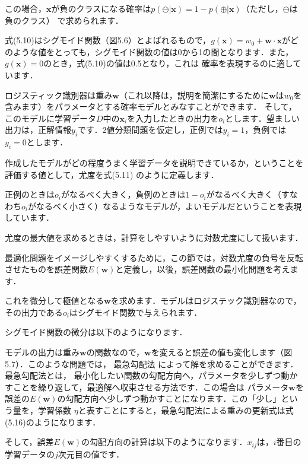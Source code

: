 この場合，$\bm{x}$が負のクラスになる確率は$p(\ominus|\bm{x}) = 1 - p(\oplus|\bm{x})$（ただし，$\ominus$は負のクラス）
で求められます．

式(5.10)はシグモイド関数（図5.6）とよばれるもので，$g(\bm{x}) = w_0+\bm{w}\cdot\bm{x}$がどのような値をとっても，シグモイド関数の値は0から1の間となります．また，$g(\bm{x})=0$のとき，式(5.10)の値は0.5となり，これは
確率を表現するのに適しています．


ロジスティック識別器は重み$\bm{w}$（これ以降は，説明を簡潔にするために$\bm{w}$は$w_0$を含みます）をパラメータとする確率モデルとみなすことができます．
そして，このモデルに学習データ$D$中の$\bm{x}_i$を入力したときの出力を$o_i$とします．望ましい出力は，正解情報$y_i$です．2値分類問題を仮定し，正例では$y_i=1$，負例では$y_i=0$とします．

作成したモデルがどの程度うまく学習データを説明できているか，ということを評価する値として，尤度を式(5.11)
のように定義します．

正例のときは$o_i$がなるべく大きく，負例のときは$1-o_i$がなるべく大きく（すなわち$o_i$がなるべく小さく）なるようなモデルが，よいモデルだということを表現しています．

尤度の最大値を求めるときは，計算をしやすいように対数尤度にして扱います．

最適化問題をイメージしやすくするために，この節では，対数尤度の負号を反転させたものを誤差関数$E(\bm{w})$と定義し，以後，誤差関数の最小化問題を考えます．

これを微分して極値となる$\bm{w}$を求めます．モデルはロジステック識別器なので，その出力である$o_i$はシグモイド関数で与えられます．

シグモイド関数の微分は以下のようになります．


モデルの出力は重み$\bm{w}$の関数なので，$\bm{w}$を変えると誤差の値も変化します（図5.7）．このような問題では，
最急勾配法
によって解を求めることができます．最急勾配法とは，
最小化したい関数の勾配方向へ，パラメータを少しずつ動かすことを繰り返して，最適解へ収束させる方法です．この場合は
パラメータ$\bm{w}$を誤差の$E(\bm{w})$の勾配方向へ少しずつ動かすことになります．この「少し」という量を，学習係数
$\eta$と表すことにすると，最急勾配法による重みの更新式は式(5.16)のようになります．


そして，誤差$E(\bm{w})$の勾配方向の計算は以下のようになります．$x_{ij}$は，$i$番目の学習データの$j$次元目の値です．

